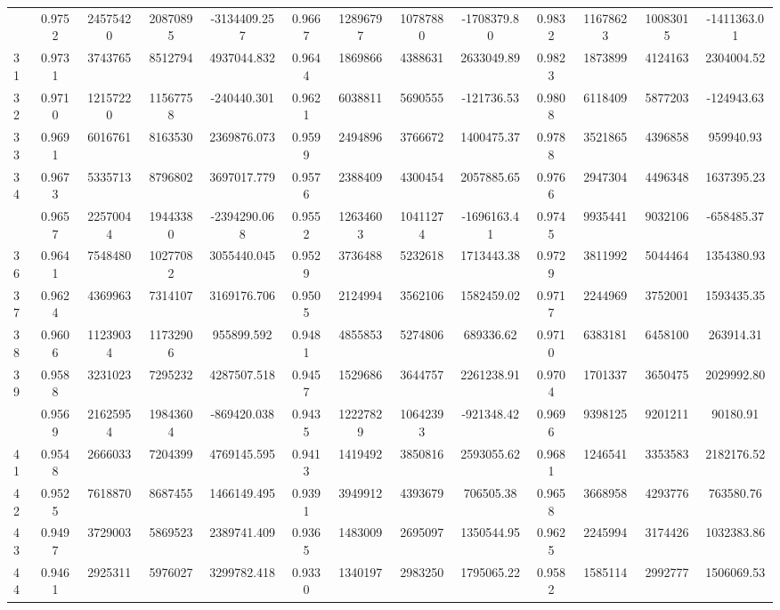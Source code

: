 \documentclass[
  12pt,
]{article}
\begin{document}
\begin{longtable}[t]{lcccccccccccc}
\addlinespace
30 & 0.9752 & 24575420 & 20870895 & -3134409.257 & 0.9667 & 12896797 & 10787880 & -1708379.80 & 0.9832 & 11678623 & 10083015 & -1411363.01\\
31 & 0.9731 & 3743765 & 8512794 & 4937044.832 & 0.9644 & 1869866 & 4388631 & 2633049.89 & 0.9823 & 1873899 & 4124163 & 2304004.52\\
32 & 0.9710 & 12157220 & 11567758 & -240440.301 & 0.9621 & 6038811 & 5690555 & -121736.53 & 0.9808 & 6118409 & 5877203 & -124943.63\\
33 & 0.9691 & 6016761 & 8163530 & 2369876.073 & 0.9599 & 2494896 & 3766672 & 1400475.37 & 0.9788 & 3521865 & 4396858 & 959940.93\\
34 & 0.9673 & 5335713 & 8796802 & 3697017.779 & 0.9576 & 2388409 & 4300454 & 2057885.65 & 0.9766 & 2947304 & 4496348 & 1637395.23\\
\addlinespace
35 & 0.9657 & 22570044 & 19443380 & -2394290.068 & 0.9552 & 12634603 & 10411274 & -1696163.41 & 0.9745 & 9935441 & 9032106 & -658485.37\\
36 & 0.9641 & 7548480 & 10277082 & 3055440.045 & 0.9529 & 3736488 & 5232618 & 1713443.38 & 0.9729 & 3811992 & 5044464 & 1354380.93\\
37 & 0.9624 & 4369963 & 7314107 & 3169176.706 & 0.9505 & 2124994 & 3562106 & 1582459.02 & 0.9717 & 2244969 & 3752001 & 1593435.35\\
38 & 0.9606 & 11239034 & 11732906 & 955899.592 & 0.9481 & 4855853 & 5274806 & 689336.62 & 0.9710 & 6383181 & 6458100 & 263914.31\\
39 & 0.9588 & 3231023 & 7295232 & 4287507.518 & 0.9457 & 1529686 & 3644757 & 2261238.91 & 0.9704 & 1701337 & 3650475 & 2029992.80\\
\addlinespace
40 & 0.9569 & 21625954 & 19843604 & -869420.038 & 0.9435 & 12227829 & 10642393 & -921348.42 & 0.9696 & 9398125 & 9201211 & 90180.91\\
41 & 0.9548 & 2666033 & 7204399 & 4769145.595 & 0.9413 & 1419492 & 3850816 & 2593055.62 & 0.9681 & 1246541 & 3353583 & 2182176.52\\
42 & 0.9525 & 7618870 & 8687455 & 1466149.495 & 0.9391 & 3949912 & 4393679 & 706505.38 & 0.9658 & 3668958 & 4293776 & 763580.76\\
43 & 0.9497 & 3729003 & 5869523 & 2389741.409 & 0.9365 & 1483009 & 2695097 & 1350544.95 & 0.9625 & 2245994 & 3174426 & 1032383.86\\
44 & 0.9461 & 2925311 & 5976027 & 3299782.418 & 0.9330 & 1340197 & 2983250 & 1795065.22 & 0.9582 & 1585114 & 2992777 & 1506069.53\\

\end{longtable}
\end{document}
